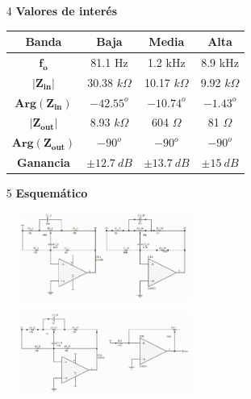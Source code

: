 \begin{multicols}{2}
\begin{enumerate}
	\item[4] \textbf{Valores de interés}
	\begin{table}[H]
		\begin{tabular}{cccc}
			\hline
			\textbf{Banda} & \textbf{Baja} & \textbf{Media} & \textbf{Alta} \\
			\hline			
			$\mathbf{f_{o}}$ & 81.1 Hz & 1.2 kHz & 8.9 kHz \\
			$\mathbf{|Z_{in}|}$ & 30.38 $k\Omega$ & 10.17 $k\Omega$ & 9.92 $k\Omega$ \\
			$\mathbf{Arg\left(Z_{in}\right)}$ & $-42.55^o$ & $-10.74^o$ & $-1.43^o$ \\
			$\mathbf{|Z_{out}|}$ & 8.93 $k\Omega$ & 604 $\Omega$ & 81 $\Omega$ \\
			$\mathbf{Arg\left(Z_{out}\right)}$ & $-90^o$ & $-90^o$ & $-90^o$ \\
			\textbf{Ganancia} & $\pm 12.7 \ dB$ & $\pm 13.7 \ dB$ & $\pm 15 \ dB$ \\
			\hline
		\end{tabular}
	\end{table}

\end{enumerate}
\end{multicols}

\begin{enumerate}
	\item[5] \textbf{Esquemático}\\
\end{enumerate}

\begin{multicols}{2}
\centering
	\begin{figure}[H]
		\includegraphics[width=0.5\textwidth]{Imagenes/Schematic-1.png}
	\end{figure}
	\begin{figure}[H]
			\includegraphics[width=0.5\textwidth]{Imagenes/Schematic-2.png}
	\end{figure}
\end{multicols}

